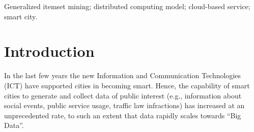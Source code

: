 \documentclass[10pt, conference, compsocconf]{IEEEtran}
\newcommand{\SeTAB}{{\sc MGI-Cloud}}
\begin{document}
\begin{abstract}
In the era of smart cities huge data volumes are continuously generated and collected, thus prompting the need for efficient 
and distributed data mining approaches. 
Generalized itemset mining is an established data mining technique, which entails the discovery of multiple-level patterns 
hidden in the analyzed data by exploiting analyst-provided taxonomies.
Among the generalized itemsets, the most peculiar high-level patterns are those with many contrasting correlations among items at different abstraction levels. 
They represent misleading situations that are worth analyzing separately by experts during manual inspection.

This paper proposes a novel cloud-based service, named \SeTAB,
to efficiently mine misleading multiple-level patterns, i.e., the Misleading Generalized Itemsets, on a distributed computing environment.
\SeTAB\ consists of a set of distributed MapReduce jobs running in the cloud.
As a case study, the system has been contextualized in a real-life scenario, i.e., the analysis of traffic law infractions committed in a smart city environment.
The experiments, performed on real datasets, demonstrate the efficiency and effectiveness of \SeTAB. 



\end{abstract}

\begin{IEEEkeywords}
Generalized itemset mining; distributed computing model; cloud-based service; smart city.
\end{IEEEkeywords}

\IEEEpeerreviewmaketitle



\section{Introduction}

In the last few years the new Information and Communication Technologies (ICT) have supported cities in becoming smart.
Hence, the capability of smart cities to generate and collect data of public interest (e.g., information about social events, public service usage, traffic law infractions) has increased at an unprecedented rate, 
to such an extent that data rapidly scales towards ``Big Data''. 
\end{document}
